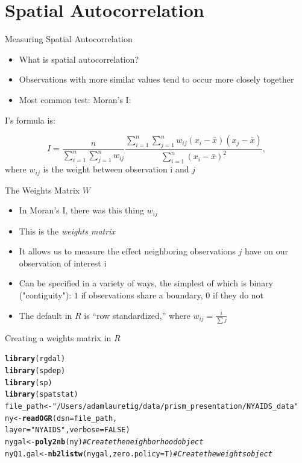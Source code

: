 \documentclass[aspectratio = 169, 12pt]{beamer}\usepackage[]{graphicx}\usepackage[]{color}
\makeatletter
\newcommand{\hlnum}[1]{\textcolor[rgb]{0.686,0.059,0.569}{#1}}%
\newcommand{\hlstr}[1]{\textcolor[rgb]{0.192,0.494,0.8}{#1}}%
\newcommand{\hlcom}[1]{\textcolor[rgb]{0.678,0.584,0.686}{\textit{#1}}}%
\newcommand{\hlstd}[1]{\textcolor[rgb]{0.345,0.345,0.345}{#1}}%
\newcommand{\hlkwb}[1]{\textcolor[rgb]{0.69,0.353,0.396}{#1}}%
\newcommand{\hlkwc}[1]{\textcolor[rgb]{0.333,0.667,0.333}{#1}}%
\newcommand{\hlkwd}[1]{\textcolor[rgb]{0.737,0.353,0.396}{\textbf{#1}}}%
\newenvironment{kframe}{%
 \def\at@end@of@kframe{}%
 \ifinner\ifhmode%
  \def\at@end@of@kframe{\end{minipage}}%
  \begin{minipage}{\columnwidth}%
 \fi\fi%
 \def\FrameCommand##1{\hskip\@totalleftmargin \hskip-\fboxsep
 \colorbox{shadecolor}{##1}\hskip-\fboxsep
     \hskip-\linewidth \hskip-\@totalleftmargin \hskip\columnwidth}%
 \MakeFramed {\advance\hsize-\width
   \@totalleftmargin\z@ \linewidth\hsize
   \@setminipage}}%
 {\par\unskip\endMakeFramed%
 \at@end@of@kframe}
\newenvironment{knitrout}{}{} %
\makeatother
\begin{document}
\section{Spatial Autocorrelation}
\begin{frame}{Measuring Spatial Autocorrelation}
\begin{itemize}
\item What is spatial autocorrelation?
\item Observations with more similar values tend to occur more closely together
\item Most common test: Moran's I:
\end{itemize}
I's formula is:

\begin{equation*}
I = \frac{n}{\sum_{i=1}^n \sum_{j=1}^n w_{ij}}
\frac{\displaystyle\sum_{i=1}^n \sum_{j=1}^n w_{ij}(x_i - \bar{x})(x_j -
  \bar{x})}{\displaystyle\sum_{i=1}^n (x_i - \bar{x})^2},\label{eq:morani}
\end{equation*}
where $w_{ij}$ is the weight between observation i and $j$
\end{frame}

\begin{frame}{The Weights Matrix $W$}
\begin{itemize}
\item In Moran's I, there was this thing $w_{ij}$
\item This is the \textit{weights matrix}
\item It allows us to measure the effect neighboring observations $j$ have on our observation of interest i
\item Can be specified in a variety of ways, the simplest of which is binary ("contiguity"): $1$ if observations share a boundary, $0$ if they do not
\item The default in $R$ is ``row standardized,'' where $w_{ij} = \frac{i}{\sum j}$
\end{itemize}
\end{frame}


\begin{frame}[fragile]{Creating a weights matrix in $R$}
\begin{knitrout}\tiny
{}\color{fgcolor}\begin{kframe}
\begin{alltt}
\hlkwd{library}\hlstd{(rgdal)}
\hlkwd{library}\hlstd{(spdep)}
\hlkwd{library}\hlstd{(sp)}
\hlkwd{library}\hlstd{(spatstat)}
\hlstd{file_path} \hlkwb{<-} \hlstr{"/Users/adamlauretig/data/prism_presentation/NYAIDS_data"}
\hlstd{ny} \hlkwb{<-} \hlkwd{readOGR}\hlstd{(}\hlkwc{dsn} \hlstd{= file_path,}
              \hlkwc{layer} \hlstd{=} \hlstr{"NYAIDS"}\hlstd{,} \hlkwc{verbose}\hlstd{=}\hlnum{FALSE}\hlstd{)}
\hlstd{nygal} \hlkwb{<-} \hlkwd{poly2nb}\hlstd{(ny)} \hlcom{#Create the neighborhood object}
\hlstd{nyQ1.gal} \hlkwb{<-} \hlkwd{nb2listw}\hlstd{(nygal,} \hlkwc{zero.policy}\hlstd{=T)} \hlcom{#Create the weights object}
\end{alltt}
\end{kframe}
\end{knitrout}
\end{frame}
\end{document}
